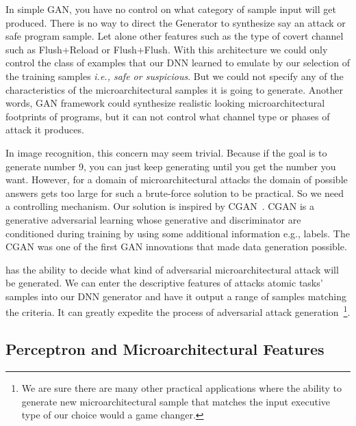  In simple GAN, you have no control on what category of sample input will get produced. There is no way to direct the Generator to synthesize say an attack or safe program sample. Let alone other features such as the type of covert channel such as Flush+Reload or Flush+Flush.
With this architecture we could only control the class of examples that our DNN learned to emulate by our selection of the training samples {\em i.e., safe or suspicious}. But we could not specify any of the characteristics of the microarchitectural samples it is going to generate. Another words, GAN framework could synthesize realistic looking microarchitectural footprints of programs, but it can not control what channel type or phases of attack it produces.

 
 In image recognition, this concern may seem trivial. Because if the goal is to generate number 9, you can just keep generating until you get the number you want. However, for a domain of microarchitectural attacks the domain of possible answers gets too large for such a brute-force solution to be practical. So we need a controlling mechanism.
Our solution is inspired by CGAN~\cite{cgan}. CGAN is a generative adversarial learning whose generative and discriminator are conditioned during training by using some additional information e.g., labels. The CGAN was one of the first GAN innovations that made data generation possible.  
 
 {\scheme} has the ability to decide what kind of adversarial microarchitectural attack will be generated. We can enter the descriptive features of attacks atomic tasks' samples into our DNN generator and have it output a range of samples matching the criteria. It can greatly expedite the process of adversarial attack generation~\footnote{We are sure there are many other practical applications where the ability to generate new microarchitectural sample that matches the input executive type of our choice would a game changer.}.
 
 \subsection{Perceptron and Microarchitectural Features}


